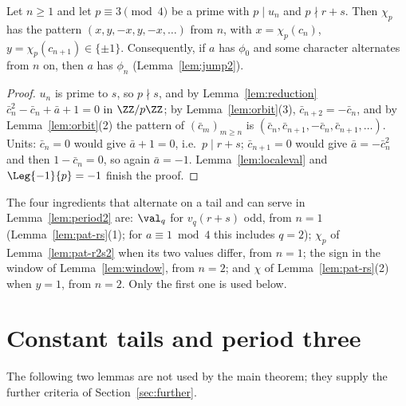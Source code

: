 \begin{lemma}
  \label{lem:period2}
  \leanok
  Let $n \ge 1$ and let $p \equiv 3 \pmod 4$ be a prime with $p \mid u_n$ and $p \nmid r + s$.
  Then $\chi_p$ has the pattern $(x, y, -x, y, -x, \dots)$ from $n$, with
  $x = \chi_p(c_n)$, $y = \chi_p(c_{n+1}) \in \{\pm 1\}$. Consequently, if $a$ has $\phi_0$
  and some character alternates from $n$ on, then $a$ has $\phi_n$
  (Lemma~\ref{lem:jump2}).
\end{lemma}
\begin{proof}
  \leanok
  $u_n$ is prime to $s$, so $p \nmid s$, and by Lemma~\ref{lem:reduction}
  $\bar c_n^2 - \bar c_n + \bar a + 1 = 0$ in $\ZZ/p\ZZ$; by Lemma~\ref{lem:orbit}(3),
  $\bar c_{n+2} = -\bar c_n$, and by Lemma~\ref{lem:orbit}(2) the pattern of $(\bar c_m)_{m \ge n}$ is
  $(\bar c_n, \bar c_{n+1}, -\bar c_n, \bar c_{n+1}, \dots)$. Units: $\bar c_n = 0$ would give
  $\bar a + 1 = 0$, i.e.\ $p \mid r + s$; $\bar c_{n+1} = 0$ would give $\bar a = -\bar c_n^2$ and
  then $1 - \bar c_n = 0$, so again $\bar a = -1$. Lemma~\ref{lem:localeval} and
  $\Leg{-1}{p} = -1$ finish the proof.
\end{proof}

\begin{remark}
  The four ingredients that alternate on a tail and can serve in Lemma~\ref{lem:period2} are:
  $\val_q$ for $v_q(r + s)$ odd, from $n = 1$ (Lemma~\ref{lem:pat-rs}(1); for
  $a \equiv 1 \bmod 4$ this includes $q = 2$); $\chi_p$ of Lemma~\ref{lem:pat-r2s2} when its two
  values differ, from $n = 1$; the sign in the window of Lemma~\ref{lem:window}, from $n = 2$;
  and $\chi$ of Lemma~\ref{lem:pat-rs}(2) when $y = 1$, from $n = 2$. Only the first one is used
  below.
\end{remark}

\section{Constant tails and period three}

The following two lemmas are not used by the main theorem; they supply the further criteria of
Section~\ref{sec:further}.

